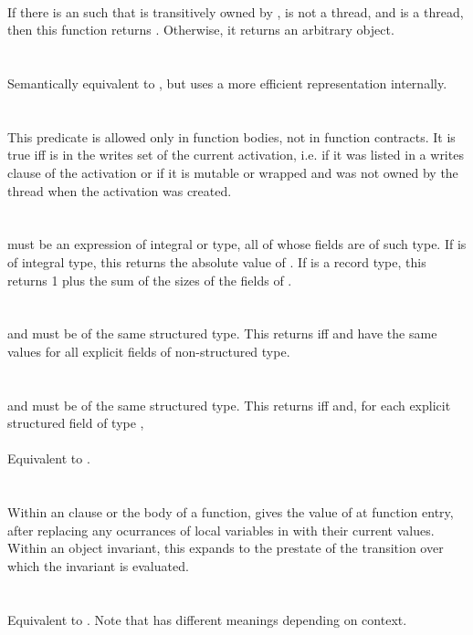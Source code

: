 \documentclass[preprint,nocopyrightspace]{sigplanconf}
\begin{document}
{{\\
If there is an  such that  is transitively
owned by ,  is not a thread, and  is a
thread, then this function returns . Otherwise, it returns an
arbitrary object.
\\\\
\\
Semantically equivalent to , but
uses a more efficient representation internally.
\\\\
\\
This predicate is allowed only in function bodies, not in function
contracts. It is true iff  is in the writes set of the current
activation, i.e. if it was listed in a writes clause of the activation
or if it is mutable or wrapped and was not owned by the thread when
the activation was created.
\\\\
\\
 must be an expression of integral or 
type, all of whose fields are of such type. If  is of integral
type, this returns the absolute value of . If  is a
record type, this returns 1 plus the sum of the sizes of the fields
of . 
\\\\
\\
 and  must be of the same structured type.
This returns \vcc{\true} iff  and  have the same
values for all explicit fields of non-structured type.
\\\\
\\
 and  must be of the same structured type. 
This returns \vcc{\true} iff  and, for each explicit
structured field  of type , 
\\\\
Equivalent to .
\\\\
\\
Within an \vcc{\ensures} clause or the body of a
function,  gives the
value of  at function entry, after replacing any ocurrances of
local variables in  with their current values.
Within an object invariant, this expands to the prestate of the
transition over which the invariant is evaluated. 
\\
\\
\\
Equivalent to . Note that \vcc{\old} has
different meanings depending on context.\\

}}
\end{document}
